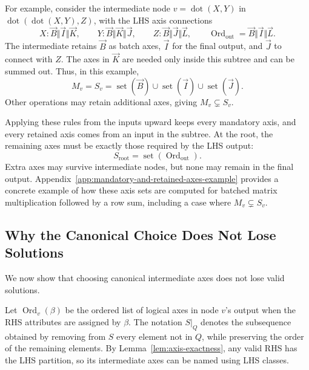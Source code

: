 For example, consider the intermediate node $v=\operatorname{dot}(X,Y)$ in
$\operatorname{dot}(\operatorname{dot}(X,Y),Z)$, with the LHS axis connections
\begin{equation}
 X:\vec B\Vert\vec I\Vert\vec K,\qquad
 Y:\vec B\Vert\vec K\Vert\vec J,\qquad
 Z:\vec B\Vert\vec J\Vert\vec L,\qquad
 \operatorname{Ord}_{\mathrm{out}}=\vec B\Vert\vec I\Vert\vec L.
\end{equation}
The intermediate retains $\vec B$ as batch axes, $\vec I$ for the final
output, and $\vec J$ to connect with $Z$.
The axes in $\vec K$ are needed only inside this subtree
and can be summed out. Thus, in this example,
\begin{equation}
 M_v=S_v=\operatorname{set}(\vec B)\cup\operatorname{set}(\vec I)
 \cup\operatorname{set}(\vec J).
\end{equation}
Other operations may retain additional axes, giving $M_v\subsetneq S_v$.

Applying these rules from the inputs upward keeps every mandatory axis,
and every retained axis comes from an input in the subtree. At the root,
the remaining axes must be exactly those required by the LHS output:
\begin{equation}
 S_{\mathrm{root}}=\operatorname{set}(\operatorname{Ord}_{\mathrm{out}}).
 \label{eq:root-live}
\end{equation}
Extra axes may survive intermediate nodes, but none may remain in the final
output. Appendix~\ref{app:mandatory-and-retained-axes-example} provides a concrete example
of how these axis sets are computed for batched matrix multiplication
followed by a row sum, including a case where $M_v\subsetneq S_v$.

\subsection{Why the Canonical Choice Does Not Lose Solutions}
\label{sec:canonical-choice-preserves-solutions}
We now show that choosing canonical intermediate axes does not lose valid
solutions.

Let $\operatorname{Ord}_v(\beta)$ be the ordered list of logical axes
in node $v$'s output when the RHS attributes are assigned by $\beta$.
The notation $S|_Q$ denotes the subsequence obtained by removing from $S$
every element not in $Q$, while preserving the order of the remaining elements. By
Lemma~\ref{lem:axis-exactness}, any valid RHS has the LHS partition, so its
intermediate axes can be named using LHS classes.

